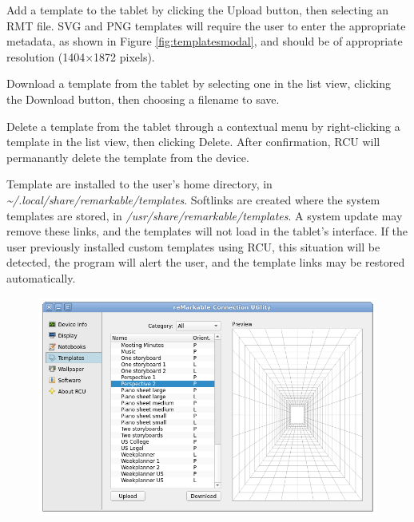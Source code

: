 \documentclass{memoir}
\begin{document}
{Add a template to the tablet by clicking the Upload button, then selecting an RMT file. SVG and PNG templates will require the user to enter the appropriate metadata, as shown in Figure \ref{fig:templatesmodal}, and should be of appropriate resolution (1404$\times$1872 pixels).

Download a template from the tablet by selecting one in the list view, clicking the Download button, then choosing a filename to save.

Delete a template from the tablet through a contextual menu by right-clicking a template in the list view, then clicking Delete. After confirmation, RCU will permanantly delete the template from the device.

Template are installed to the user's home directory, in \textit{\textasciitilde/.local/share/remarkable/templates}. Softlinks are created where the system templates are stored, in \textit{/usr/share/remarkable/templates}. A system update may remove these links, and the templates will not load in the tablet's interface. If the user previously installed custom templates using RCU, this situation will be detected, the program will alert the user, and the template links may be restored automatically.

\vfill
\begin{figure}[h]
  \centering
  \includegraphics[width=\linewidth]{images/templates.png}
  \caption{}
  \label{fig:templatespane}
\end{figure}

}
\end{document}
